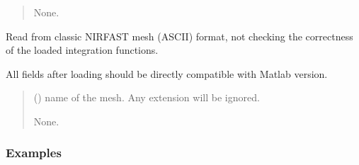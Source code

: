 \documentclass[letterpaper,10pt,english]{sphinxmanual}
\begin{document}
\begin{fulllineitems}
\begin{fulllineitems}
\begin{quote}
\begin{description}
\sphinxAtStartPar
None.

\end{description}\end{quote}

\end{fulllineitems}


\begin{fulllineitems}
\label{\detokenize{_autosummary/nirfasterff.base.stnd_mesh.stndmesh:nirfasterff.base.stnd_mesh.stndmesh.from_file}}
\pysigstartsignatures
\pysiglinewithargsret
{}
{}
{}
\pysigstopsignatures
\sphinxAtStartPar
Read from classic NIRFAST mesh (ASCII) format, not checking the correctness of the loaded integration functions.

\sphinxAtStartPar
All fields after loading should be directly compatible with Matlab version.
\begin{quote}\begin{description}
\sphinxAtStartPar
{} () \textendash{} name of the mesh. Any extension will be ignored.

\sphinxAtStartPar
None.

\end{description}\end{quote}
\subsubsection*{Examples}

\begin{sphinxVerbatim}[commandchars=\\\{\}]
  
\end{sphinxVerbatim}

\end{fulllineitems}



\end{fulllineitems}
\end{document}
